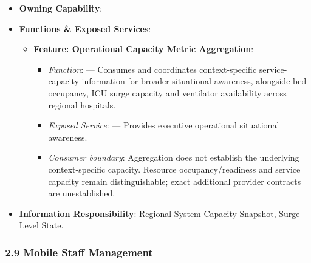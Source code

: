 \begin{itemize}

\item 
\textbf{Owning Capability}: \texttt{}



\item 
\textbf{Functions \& Exposed Services}:


\begin{itemize}

\item 
\textbf{Feature: Operational Capacity Metric Aggregation}:


\begin{itemize}

\item 
\emph{Function}: \texttt{} — Consumes and coordinates context-specific service-capacity information for broader situational awareness, alongside bed occupancy, ICU surge capacity and ventilator availability across regional hospitals.



\item 
\emph{Exposed Service}: \texttt{} — Provides executive operational situational awareness.



\item 
\emph{Consumer boundary}: Aggregation does not establish the underlying context-specific capacity. Resource occupancy/\allowbreak{}readiness and service capacity remain distinguishable; exact additional provider contracts are unestablished.



\end{itemize}


\end{itemize}


\item 
\textbf{Information Responsibility}: Regional System Capacity Snapshot, Surge Level State.



\end{itemize}
\label{rad:hso:187}

\par\smallskip
{}\label{rad:hso:189}
\subsubsection*{2.9 Mobile Staff Management}
\label{rad:hso:190}

